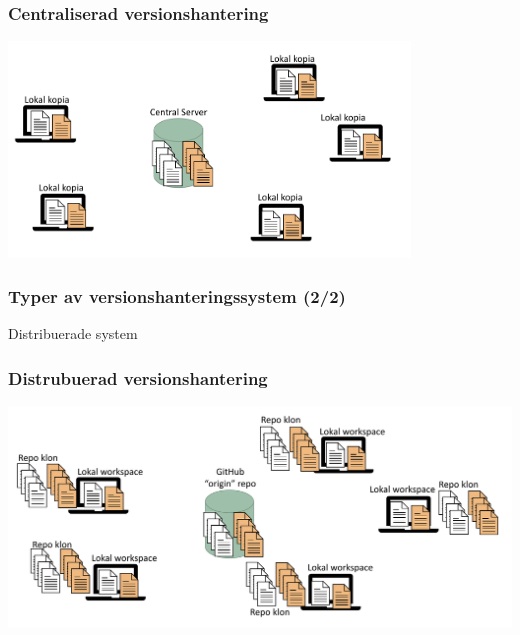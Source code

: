 \begin{frame}
    \frametitle{Centraliserad versionshantering}

    \begin{center}
        \includegraphics[width=0.80\textwidth]{figs/fig1_central_model.png}
    \end{center}
\end{frame}

\begin{frame}
    \frametitle{Typer av versionshanteringssystem (2/2)}

    \begin{block}{Distribuerade system}
        \begin{itemize}
        \end{itemize}
    \end{block}

\end{frame}

\begin{frame}
    \frametitle{Distrubuerad versionshantering}

    \begin{center}
        \includegraphics[width=\textwidth]{figs/fig2_git_model.png}
    \end{center}
\end{frame}

